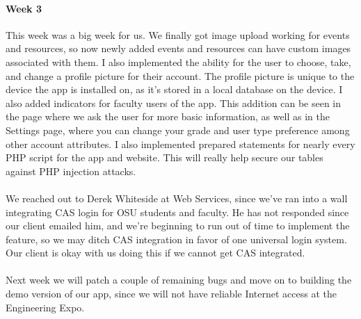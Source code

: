\documentclass[onecolumn, draftclsnofoot,10pt, compsoc]{IEEEtran}
\begin{document}
      \paragraph{Week 3}
      This week was a big week for us. We finally got image upload working for events and resources, so now newly added events and resources can have custom images associated with them. I also implemented the ability for the user to choose, take, and change a profile picture for their account. The profile picture is unique to the device the app is installed on, as it's stored in a local database on the device. I also added indicators for faculty users of the app. This addition can be seen in the page where we ask the user for more basic information, as well as in the Settings page, where you can change your grade and user type preference among other account attributes. I also implemented prepared statements for nearly every PHP script for the app and website. This will really help secure our tables against PHP injection attacks. \\ \\
      We reached out to Derek Whiteside at Web Services, since we’ve ran into a wall integrating CAS login for OSU students and faculty. He has not responded since our client emailed him, and we're beginning to run out of time to implement the feature, so we may ditch CAS integration in favor of one universal login system. Our client is okay with us doing this if we cannot get CAS integrated. \\ \\
      Next week we will patch a couple of remaining bugs and move on to building the demo version of our app, since we will not have reliable Internet access at the Engineering Expo. \\ \\
\end{document}
